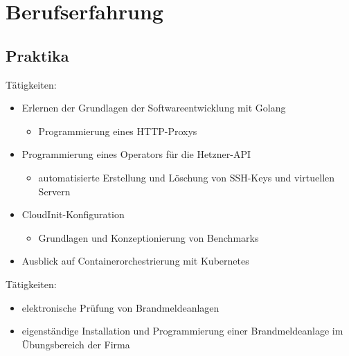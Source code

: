 \documentclass[11pt,a4paper,sans]{moderncv}        %
\begin{document}
\section{Berufserfahrung}
\subsection{Praktika}
\begin{adjustwidth}{6.5em}{1cm}
Tätigkeiten:
\begin{itemize}
\setlength\itemsep{0.05em}
\item Erlernen der Grundlagen der Softwareentwicklung mit Golang
  \begin{itemize}
  \item Programmierung eines HTTP-Proxys
  \end{itemize}
\item Programmierung eines Operators für die Hetzner-API
  \begin{itemize}
  \item automatisierte Erstellung und Löschung von SSH-Keys und virtuellen Servern
  \end{itemize}
\item CloudInit-Konfiguration
  \begin{itemize}
  \item Grundlagen und Konzeptionierung von Benchmarks
  \end{itemize}
  \item Ausblick auf Containerorchestrierung mit Kubernetes
\end{itemize}
\end{adjustwidth}
\vspace{0.5\baselineskip}
\begin{adjustwidth}{6.5em}{1cm}
Tätigkeiten:
\begin{itemize}
  \setlength\itemsep{0.05em}
  \item elektronische Prüfung von Brandmeldeanlagen
  \item eigenständige Installation und Programmierung einer Brandmeldeanlage im Übungsbereich der Firma
\end{itemize}
\end{adjustwidth}
%
\end{document}
